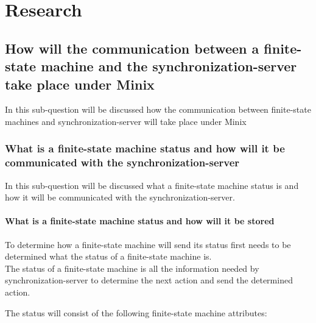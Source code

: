 \hypertarget{research}{%
\section{Research}\label{research}}

\hypertarget{how-will-the-communication-between-a-finite-state-machine-and-the-synchronization-server-take-place-under-minix}{%
\subsection{How will the communication between a finite-state machine
and the synchronization-server take place under
Minix}\label{how-will-the-communication-between-a-finite-state-machine-and-the-synchronization-server-take-place-under-minix}}

In this sub-question will be discussed how the communication between
finite-state machines and synchronization-server will take place under
Minix

\hypertarget{what-is-a-finite-state-machine-status-and-how-will-it-be-communicated-with-the-synchronization-server}{%
\subsubsection{What is a finite-state machine status and how will it be
communicated with the
synchronization-server}\label{what-is-a-finite-state-machine-status-and-how-will-it-be-communicated-with-the-synchronization-server}}

In this sub-question will be discussed what a finite-state machine
status is and how it will be communicated with the
synchronization-server.

\hypertarget{what-is-a-finite-state-machine-status-and-how-will-it-be-stored}{%
\paragraph{What is a finite-state machine status and how will it be
stored}\label{what-is-a-finite-state-machine-status-and-how-will-it-be-stored}}

To determine how a finite-state machine will send its status first needs
to be determined what the status of a finite-state machine is.\\
The status of a finite-state machine is all the information needed by
synchronization-server to determine the next action and send the
determined action.

The status will consist of the following finite-state machine
attributes:

